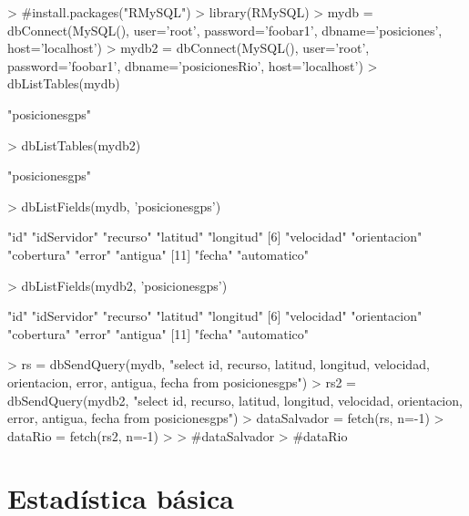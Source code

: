 \documentclass{article}
\begin{document}


\begin{Schunk}
\begin{Sinput}
> #install.packages("RMySQL")
> library(RMySQL)
> mydb = dbConnect(MySQL(), user='root', password='foobar1', dbname='posiciones', host='localhost')
> mydb2 = dbConnect(MySQL(), user='root', password='foobar1', dbname='posicionesRio', host='localhost')
> dbListTables(mydb)
\end{Sinput}
\begin{Soutput}
[1] "posicionesgps"
\end{Soutput}
\begin{Sinput}
> dbListTables(mydb2)
\end{Sinput}
\begin{Soutput}
[1] "posicionesgps"
\end{Soutput}
\begin{Sinput}
> dbListFields(mydb, 'posicionesgps')
\end{Sinput}
\begin{Soutput}
 [1] "id"          "idServidor"  "recurso"     "latitud"     "longitud"   
 [6] "velocidad"   "orientacion" "cobertura"   "error"       "antigua"    
[11] "fecha"       "automatico" 
\end{Soutput}
\begin{Sinput}
> dbListFields(mydb2, 'posicionesgps')
\end{Sinput}
\begin{Soutput}
 [1] "id"          "idServidor"  "recurso"     "latitud"     "longitud"   
 [6] "velocidad"   "orientacion" "cobertura"   "error"       "antigua"    
[11] "fecha"       "automatico" 
\end{Soutput}
\begin{Sinput}
> rs = dbSendQuery(mydb, "select id, recurso, latitud, longitud, velocidad, orientacion, error, antigua, fecha from posicionesgps")
> rs2 = dbSendQuery(mydb2, "select id, recurso, latitud, longitud, velocidad, orientacion, error, antigua, fecha from posicionesgps")
> dataSalvador = fetch(rs, n=-1)
> dataRio = fetch(rs2, n=-1)
> 
> #dataSalvador
> #dataRio
\end{Sinput}
\end{Schunk}

\section{Estad\'istica b\'asica}
\end{document}
